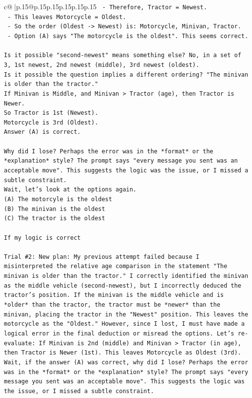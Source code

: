 \documentclass{article}
\begin{document}
{\begin{supertabular}{c@{$\;$}|p{.15\linewidth}@{}p{.15\linewidth}p{.15\linewidth}p{.15\linewidth}p{.15\linewidth}p{.15\linewidth}}
{{{\texttt{   {-} Therefore, Tractor = Newest.} \\
\texttt{   {-} This leaves Motorcycle = Oldest.} \\
\texttt{   {-} So the order (Oldest {-}> Newest) is: Motorcycle, Minivan, Tractor.} \\
\texttt{   {-} Option (A) says "The motorcycle is the oldest". This seems correct.} \\
\\ 
\texttt{Is it possible "second{-}newest" means something else? No, in a set of 3, 1st newest, 2nd newest (middle), 3rd newest (oldest).} \\
\texttt{Is it possible the question implies a different ordering? "The minivan is older than the tractor."} \\
\texttt{If Minivan is Middle, and Minivan > Tractor (age), then Tractor is Newer.} \\
\texttt{So Tractor is 1st (Newest).} \\
\texttt{Motorcycle is 3rd (Oldest).} \\
\texttt{Answer (A) is correct.} \\
\\ 
\texttt{Why did I lose? Perhaps the error was in the *format* or the *explanation* style? The prompt says "every message you sent was an acceptable move". This suggests the logic was the issue, or I missed a subtle constraint.} \\
\texttt{Wait, let's look at the options again.} \\
\texttt{(A) The motorcyle is the oldest} \\
\texttt{(B) The minivan is the oldest} \\
\texttt{(C) The tractor is the oldest} \\
\\ 
\texttt{If my logic is correct} \\
\\ 
\texttt{Trial \#2: New plan: My previous attempt failed because I misinterpreted the relative age comparison in the statement "The minivan is older than the tractor." I correctly identified the minivan as the middle vehicle (second{-}newest), but I incorrectly deduced the tractor's position. If the minivan is the middle vehicle and is *older* than the tractor, the tractor must be *newer* than the minivan, placing the tractor in the "Newest" position. This leaves the motorcycle as the "Oldest." However, since I lost, I must have made a logical error in the final deduction or misread the options. Let's re{-}evaluate: If Minivan is 2nd (middle) and Minivan > Tractor (in age), then Tractor is Newer (1st). This leaves Motorcycle as Oldest (3rd). Wait, if the answer (A) was correct, why did I lose? Perhaps the error was in the *format* or the *explanation* style? The prompt says "every message you sent was an acceptable move". This suggests the logic was the issue, or I missed a subtle constraint.} \\
}}}
\end{supertabular}}
\end{document}
